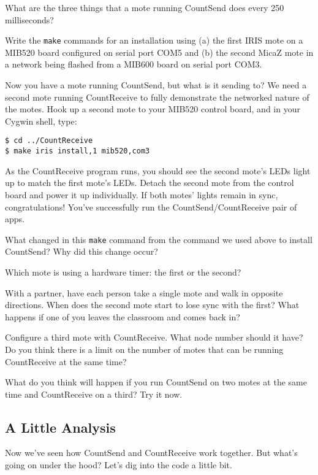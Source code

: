 \documentclass{article}
\begin{document}
 What are the three things that a mote running CountSend does every 250 milliseconds?

 Write the \verb!make! commands for an installation using (a) the first IRIS mote on a MIB520 board configured on serial port COM5 and (b) the second MicaZ mote in a network being flashed from a MIB600 board on serial port COM3.


Now you have a mote running CountSend, but what is it sending to? We need a second mote running CountReceive to fully demonstrate the networked nature of the motes. Hook up a second mote to your MIB520 control board, and in your Cygwin shell, type:

\begin{verbatim}
$ cd ../CountReceive
$ make iris install,1 mib520,com3
\end{verbatim}

As the CountReceive program runs, you should see the second mote's LEDs light up to match the first mote's LEDs. Detach the second mote from the control board and power it up individually. If both motes' lights remain in sync, congratulations! You've successfully run the CountSend/CountReceive pair of apps.

 What changed in this \verb!make! command from the command we used above to install CountSend? Why did this change occur?

 Which mote is using a hardware timer: the first or the second?

 With a partner, have each person take a single mote and walk in opposite directions. When does the second mote start to lose sync with the first? What happens if one of you leaves the classroom and comes back in?

 Configure a third mote with CountReceive. What node number should it have? Do you think there is a limit on the number of motes that can be running CountReceive at the same time?

 What do you think will happen if you run CountSend on two motes at the same time and CountReceive on a third? Try it now.

\subsection*{A Little Analysis}

Now we've seen how CountSend and CountReceive work together. But what's going on under the hood? Let's dig into the code a little bit.
\end{document}
